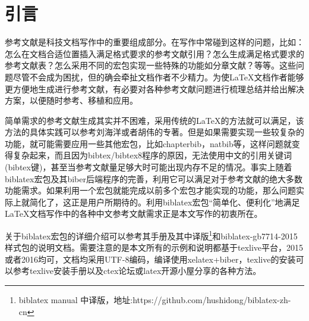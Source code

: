 \documentclass[twoside]{article} %
\begin{document}

\section{引言}

参考文献是科技文档写作中的重要组成部分。在写作中常碰到这样的问题，比如：怎么在文档合适位置插入满足格式要求的参考文献引用？怎么生成满足格式要求的参考文献表？怎么采用不同的宏包实现一些特殊的功能如分章文献？等等。这些问题尽管不会成为困扰，但的确会牵扯文档作者不少精力。为使\LaTeX 文档作者能够更方便地生成进行参考文献，有必要对各种参考文献问题进行梳理总结并给出解决方案，以便随时参考、移植和应用。

简单需求的参考文献生成其实并不困难，采用传统的\LaTeX 的方法就可以满足，该方法的具体实践可以参考刘海洋\cite{刘海洋2013--}或者胡伟\cite{胡伟2011--}的专著。但是如果需要实现一些较复杂的功能，就可能需要应用一些其他宏包，比如chapterbib，natbib等，这样问题就变得复杂起来，而且因为bibtex/bibtex8程序的原因，无法使用中文的引用关键词(bibtex键)，甚至当参考文献量足够大时可能出现内存不足的情况。事实上随着biblatex宏包及其biber后端程序的完善，利用它可以满足对于参考文献的绝大多数功能需求。如果利用一个宏包就能完成以前多个宏包才能实现的功能，那么问题实际上就简化了，这正是用户所期待的。利用biblatex宏包“简单化、便利化”地满足\LaTeX 文档写作中的各种中文参考文献需求正是本文写作的初衷所在。

关于biblatex宏包的详细介绍可以参考其手册\cite{Lehman2015}及其中译版\footnote{biblatex manual 中译版，地址:https://github.com/hushidong/biblatex-zh-cn}和biblatex-gb7714-2015样式包的说明文档\cite{胡振震2016}。需要注意的是本文所有的示例和说明都基于texlive平台，2015或者2016均可，文档均采用UTF-8编码，编译使用xelatex+biber，texlive的安装可以参考texlive安装手册\cite{Berry2016--}以及ctex论坛或latex开源小屋分享的各种方法。
\end{document}
